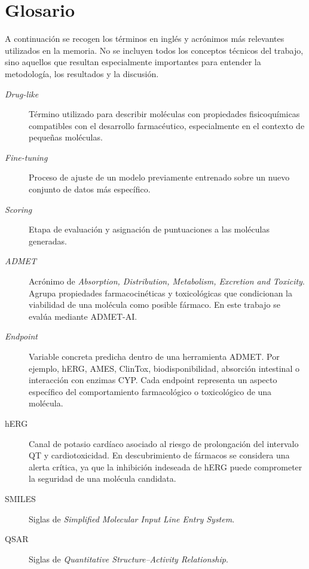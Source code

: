 \documentclass[IB]{TFUOC}%
\begin{document}
\chapter{Glosario}

A continuación se recogen los términos en inglés y acrónimos más relevantes utilizados en la memoria. No se incluyen todos los conceptos técnicos del trabajo, sino aquellos que resultan especialmente importantes para entender la metodología, los resultados y la discusión.

\begin{description}

    \item[\textit{Drug-like}] Término utilizado para describir moléculas con propiedades fisicoquímicas compatibles con el desarrollo farmacéutico, especialmente en el contexto de pequeñas moléculas.

    \item[\textit{Fine-tuning}] Proceso de ajuste de un modelo previamente entrenado sobre un nuevo conjunto de datos más específico.

    \item[\textit{Scoring}] Etapa de evaluación y asignación de puntuaciones a las moléculas generadas.

    \item[\textit{ADMET}] Acrónimo de \textit{Absorption, Distribution, Metabolism, Excretion and Toxicity}. Agrupa propiedades farmacocinéticas y toxicológicas que condicionan la viabilidad de una molécula como posible fármaco. En este trabajo se evalúa mediante ADMET-AI.

    \item[\textit{Endpoint}] Variable concreta predicha dentro de una herramienta ADMET. Por ejemplo, hERG, AMES, ClinTox, biodisponibilidad, absorción intestinal o interacción con enzimas CYP. Cada endpoint representa un aspecto específico del comportamiento farmacológico o toxicológico de una molécula.

    \item[hERG] Canal de potasio cardíaco asociado al riesgo de prolongación del intervalo QT y cardiotoxicidad. En descubrimiento de fármacos se considera una alerta crítica, ya que la inhibición indeseada de hERG puede comprometer la seguridad de una molécula candidata.

    \item[SMILES] Siglas de \textit{Simplified Molecular Input Line Entry System}. 

    \item[QSAR] Siglas de \textit{Quantitative Structure--Activity Relationship}. 


\end{description}
\end{document}
